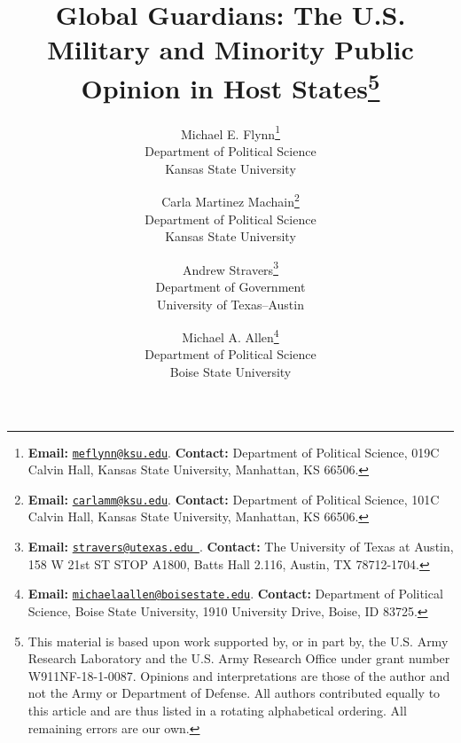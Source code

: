 \documentclass[12pt]{article}
\begin{document}
\title{Global Guardians: The U.S. Military and Minority Public Opinion in Host States\thanks{This material is based upon work supported by, or in part by, the U.S. Army Research Laboratory and the U.S. Army Research Office under grant number W911NF-18-1-0087.  Opinions and interpretations are those of the author and not the Army or Department of Defense. All authors contributed equally to this article and are thus listed in a rotating alphabetical ordering. All remaining errors are our own.}} %
\author{Michael E. Flynn\thanks{\textbf{Email:} \href{mailto:meflynn@ksu.edu}{\tt meflynn@ksu.edu}. \textbf{Contact:} Department of Political Science, 019C Calvin Hall, Kansas State University, Manhattan, KS 66506.} \\
Department of Political Science \\
Kansas State University \\
\and Carla Martinez Machain\thanks{\textbf{Email:} \href{mailto:carlamm@ksu.edu}{\tt carlamm@ksu.edu}. \textbf{Contact:} Department of Political Science, 101C Calvin Hall, Kansas State University, Manhattan, KS 66506.}\\
Department of Political Science\\
Kansas State University \\
\and
Andrew Stravers\thanks{\textbf{Email:} \href{mailto:stravers@utexas.edu }{\tt stravers@utexas.edu }. \textbf{Contact:} The University of Texas at Austin, 158 W 21st ST STOP A1800, Batts Hall 2.116, Austin, TX 78712-1704.}\\
Department of Government\\
University of Texas--Austin \\
\and
Michael A. Allen\thanks{\textbf{Email:} \href{mailto:michaelaallen@boisestate.edu}{\tt michaelaallen@boisestate.edu}. \textbf{Contact:} Department of Political Science, Boise State University, 1910 University Drive, Boise, ID 83725.}\\
Department of Political Science\\
Boise State University
}



\maketitle
\thispagestyle{empty}



\clearpage
\end{document}
